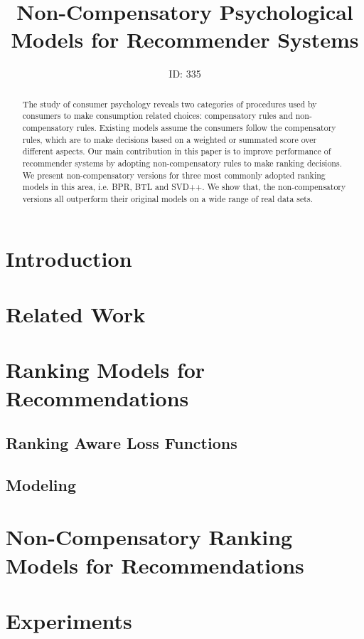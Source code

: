 \documentclass[letterpaper]{article} %
\begin{document}
%
\title{Non-Compensatory Psychological Models for Recommender Systems}
\author{ID: 335
}
\maketitle
\begin{abstract}
The study of consumer psychology reveals two categories of procedures used by consumers to make consumption related choices: compensatory rules and non-compensatory rules. Existing models assume the consumers follow the compensatory rules, which are to make decisions based on a weighted or summated score over different aspects. Our main contribution in this paper is to improve performance of recommender systems by adopting non-compensatory rules to make ranking decisions.  We present non-compensatory versions for three most commonly adopted ranking models in this area, i.e. BPR, BTL and SVD++. We show that, the non-compensatory versions all outperform their original models on a wide range of real data sets. 
\end{abstract}



\section{Introduction}


\section{Related Work}

\section{Ranking Models for Recommendations}
\subsection{Ranking Aware Loss Functions}



\subsection{Modeling }
\section{Non-Compensatory Ranking Models for Recommendations}

\section{Experiments}
\end{document}
